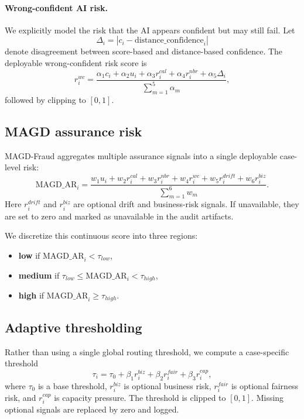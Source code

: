 \paragraph{Wrong-confident AI risk.}
We explicitly model the risk that the AI appears confident but may still fail. Let
\begin{equation}
\Delta_i = \left| c_i - \text{distance\_confidence}_i \right|
\end{equation}
denote disagreement between score-based and distance-based confidence. The deployable wrong-confident risk score is
\begin{equation}
r^{wc}_i =
\frac{
\alpha_1 c_i +
\alpha_2 u_i +
\alpha_3 r^{cal}_i +
\alpha_4 r^{nbr}_i +
\alpha_5 \Delta_i
}{
\sum_{m=1}^{5}\alpha_m
},
\end{equation}
followed by clipping to $[0,1]$.

\subsection{MAGD assurance risk}

MAGD-Fraud aggregates multiple assurance signals into a single deployable case-level risk:
\begin{equation}
\text{MAGD\_AR}_i =
\frac{
w_1 u_i +
w_2 r^{cal}_i +
w_3 r^{nbr}_i +
w_4 r^{wc}_i +
w_5 r^{drift}_i +
w_6 r^{biz}_i
}{
\sum_{m=1}^{6} w_m
}.
\end{equation}
Here $r^{drift}_i$ and $r^{biz}_i$ are optional drift and business-risk signals. If unavailable, they are set to zero and marked as unavailable in the audit artifacts.

We discretize this continuous score into three regions:
\begin{itemize}
\item \textbf{low} if $\text{MAGD\_AR}_i < \tau_{low}$,
\item \textbf{medium} if $\tau_{low} \le \text{MAGD\_AR}_i < \tau_{high}$,
\item \textbf{high} if $\text{MAGD\_AR}_i \ge \tau_{high}$.
\end{itemize}

\subsection{Adaptive thresholding}

Rather than using a single global routing threshold, we compute a case-specific threshold
\begin{equation}
\tau_i = \tau_0
      + \beta_1 r^{biz}_i
      + \beta_2 r^{fair}_i
      + \beta_3 r^{cap}_i,
\end{equation}
where $\tau_0$ is a base threshold, $r^{biz}_i$ is optional business risk, $r^{fair}_i$ is optional fairness risk, and $r^{cap}_i$ is capacity pressure. The threshold is clipped to $[0,1]$. Missing optional signals are replaced by zero and logged.

